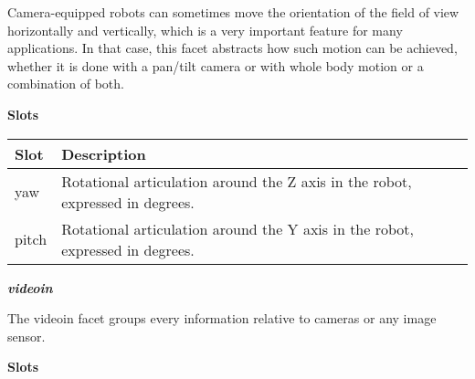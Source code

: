 \documentclass[a4paper]{article}
\begin{document}
{\sffamily
Camera-equipped robots can sometimes move the orientation of the field
of view horizontally and vertically, which is a very important feature
for many applications. In that case, this facet abstracts how such
motion can be achieved, whether it is done with a pan/tilt camera or
with whole body motion or a combination of both.}

{\sffamily\bfseries
Slots}

\begin{flushleft}
\tablehead{}
\begin{supertabular}{|m{3.293cm}|m{11.997cm}|}
\hline
{}\sffamily\bfseries Slot &
\sffamily\bfseries Description\\\hline
{} yaw &
\sffamily Rotational articulation around the Z
axis in the robot, expressed in degrees.\\\hline
{} pitch &
\sffamily Rotational articulation around the Y
axis in the robot, expressed in degrees.\\\hline
\end{supertabular}
\end{flushleft}
{\sffamily\bfseries\itshape
videoin}

{\sffamily
The videoin facet groups every information relative to cameras or any
image sensor. }

{\sffamily\bfseries
Slots}
\end{document}
